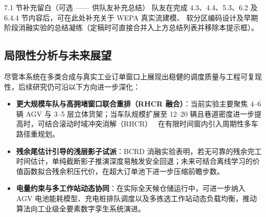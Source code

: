 \begin{teammatebox}{7.1 节补充留白（可选 —— 供队友补充总结）}
  队友在完成 4.3、4.4、5.3、6.2 及 6.4.4 节内容后，可在此处补充关于 WEPA 真实流建模、 软分区编码设计及早期阶段消融实验的总结凝练（定稿时可直接合并入上方总结列表并移除本提示框）。
\end{teammatebox}

\subsection{局限性分析与未来展望}

尽管本系统在多类合成与真实工业订单窗口上展现出稳健的调度质量与工程可复现性，后续研究仍可沿以下方向进一步深化：
\begin{itemize}
  \item \textbf{更大规模车队与高拥堵窗口联合重排（RHCR 融合）}：当前实验主要聚焦 4--6 辆 AGV 与 3--5 层立体货架；当车队规模扩展至 12--20 辆且巷道密度进一步提高时，可结合滚动时域冲突消解（RHCR）~\cite{li2021rhcr} 在有限时间窗内引入周期性多车路径重规划。
  \item \textbf{残余尾估计引导的浅层影子试派}：BCRD 消融实验表明，若无可靠的残余完工时间估计，单纯截断影子推演深度易触发安全回退；未来可结合离线学习的价值函数拟合残余积压代价，在超大订单池下进一步压缩前瞻步数。
  \item \textbf{电量约束与多工作站动态协同}：在实际全天候仓储运行中，可进一步纳入 AGV 电池能耗模型、充电桩排队调度以及多拣选工作站动态负载均衡，推动算法向工业级全要素数字孪生系统演进。
\end{itemize}
